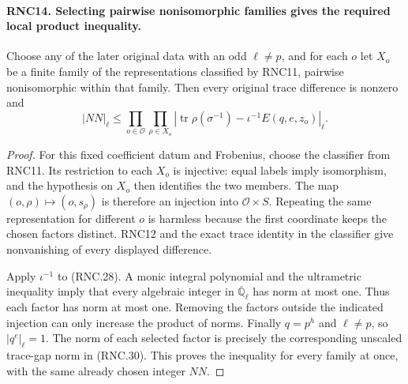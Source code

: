 \documentclass[11pt,a4paper]{article}
\numberwithin{equation}{section}
\theoremstyle{remark}\newtheorem{remark}[theorem]{Remark}
\begin{document}
\paragraph{RNC14. Selecting pairwise nonisomorphic families gives the required local product inequality.}
\label{claim:RNC14}
Choose any of the later original data with an odd
$\ell\ne p$, and for each $o$ let $X_o$ be a finite
family of the representations classified by RNC11,
pairwise nonisomorphic within that family.  Then every
original trace difference is nonzero and
\[
 |NN|_\ell\leq
 \prod_{o\in\mathcal O}\prod_{\rho\in X_o}
 \left|\operatorname{tr}\rho(\sigma^{-1})-
                         \iota^{-1}E(q,e,z_o)\right|_\ell.
                                                               \tag{RNC.30}
\]
\begin{proof}
For this fixed coefficient datum and Frobenius, choose
the classifier from RNC11.  Its restriction to each
$X_o$ is injective: equal labels imply isomorphism, and
the hypothesis on $X_o$ then identifies the two members.
The map $(o,\rho)\mapsto(o,s_\rho)$ is therefore an
injection into $\mathcal O\times S$.  Repeating the same
representation for different $o$ is harmless because
the first coordinate keeps the chosen factors distinct.
RNC12 and the exact trace identity in the classifier
give nonvanishing of every displayed difference.

Apply $\iota^{-1}$ to (RNC.28).  A monic integral
polynomial and the ultrametric inequality imply that
every algebraic integer in $\overline{\mathbb Q}_\ell$
has norm at most one.  Thus each factor has norm at most
one.  Removing the factors outside the indicated
injection can only increase the product of norms.
Finally $q=p^h$ and $\ell\ne p$, so $|q^e|_\ell=1$.
The norm of each selected factor is precisely the
corresponding unscaled trace-gap norm in (RNC.30).
This proves the inequality for every family at once,
with the same already chosen integer $NN$.
\end{proof}

\end{document}
